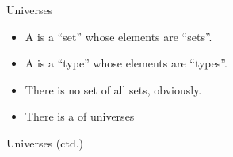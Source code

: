 \documentclass[11pt]{beamer}
\newcommand{\red}[1]{{\color{red}{#1}}}
\newcommand{\blue}[1]{{\color{blue}{#1}}}
\begin{document}
\begin{frame}{Universes} 

\begin{itemize}
\vfill\item A \red{universe} is a ``set'' whose elements are ``sets''.
\vfill\item A \red{universe} is a ``type'' whose elements are ``types''.
\vfill\item There is no set of all sets, obviously.
\vfill\item There is a \blue{hierarchy} of universes
\end{itemize}
\vfill
\end{frame}

\begin{frame}{Universes (ctd.)} 

\begin{code}\>\<%
\\
\> \AgdaSymbol{:} \<%
\\
\> \AgdaSymbol{=} \<%
\\
%
\\
\> \AgdaSymbol{:}  \<%
\\
\> \AgdaSymbol{=} \<%
\\
%
\\
\> \AgdaSymbol{:} \<%
\\
\> \AgdaSymbol{=} \<%
\\
%
\\
\> \AgdaSymbol{:} \<%
\\
\> \AgdaSymbol{=} \<%
\\
\>\<\end{code}

\end{frame}
\end{document}
